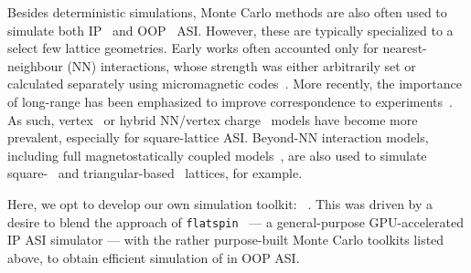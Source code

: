 Besides deterministic simulations, Monte Carlo methods are also often used to simulate both IP~\cite{Qi2008,Cugliandolo2017,LocalizedFrustratedKagome,Brunn2021,Farhan2013,ApparentFMpinwheel} and OOP~\cite{Chioar2014,PerpendicularMagnetizationASI} ASI. %
However, these are typically specialized to a select few lattice geometries.
Early works often accounted only for nearest-neighbour (NN) interactions, whose strength was either arbitrarily set or calculated separately using micromagnetic codes~\cite{Qi2008,PerpendicularMagnetizationASI}. %
More recently, the importance of long-range  has been emphasized to improve correspondence to experiments~\cite{Chioar2014,Rougemaille2011,Brunn2021}.
As such, vertex~\cite{gilbert2014emergent,Saglam2022Tetris,Goryca2021Plasma,MeltingASI} or hybrid NN/vertex charge~\cite{Canals2016,zhang2013crystallites} models have become more prevalent, especially for square-lattice ASI. %
Beyond-NN interaction models, including full magnetostatically coupled models~\cite{ApparentFMpinwheel,mengotti2011kagome}, are also used to simulate square-~\cite{Brunn2021,Farhan2013,sklenar2019field} and triangular-based~\cite{Chioar2014,Rougemaille2011,Hofhuis2020} lattices, for example. \par %
Here, we opt to develop our own simulation toolkit: \hotspice~\cite{MAES-24}.
This was driven by a desire to blend the approach of \texttt{flatspin}~\cite{flatspin} --- a general-purpose GPU-accelerated IP ASI simulator --- with the rather purpose-built Monte Carlo toolkits listed above, to obtain efficient simulation of  in OOP ASI.
